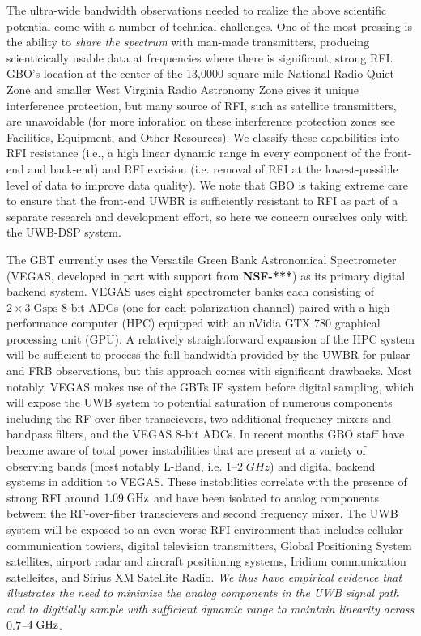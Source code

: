 \documentclass[10pt]{myNSF}
\begin{document}
\label{sec:technical_motivation}

The ultra-wide bandwidth observations needed to realize the above
scientific potential come with a number of technical challenges.  One
of the most pressing is the ability to \emph{share the spectrum} with
man-made transmitters, producing scienticically usable data at
frequencies where there is significant, strong RFI.  GBO's location at
the center of the 13,0000 square-mile National Radio Quiet Zone and
smaller West Virginia Radio Astronomy Zone gives it unique
interference protection, but many source of RFI, such as satellite
transmitters, are unavoidable (for more inforation on these
interference protection zones see Facilities, Equipment, and Other
Resources).  We classify these capabilities into RFI resistance (i.e.,
a high linear dynamic range in every component of the front-end and
back-end) and RFI excision (i.e. removal of RFI at the lowest-possible
level of data to improve data quality).  We note that GBO is taking
extreme care to ensure that the front-end UWBR is sufficiently
resistant to RFI as part of a separate research and development
effort, so here we concern ourselves only with the UWB-DSP system.

 The GBT currently uses the Versatile
Green Bank Astronomical Spectrometer (VEGAS, developed in part with
support from \textbf{NSF-***}) as its primary digital backend system.
VEGAS uses eight spectrometer banks each consisting of $2 \times 3\;
\mathrm{Gsps}$ 8-bit ADCs (one for each polarization channel) paired
with a high-performance computer (HPC) equipped with an nVidia GTX 780
graphical processing unit (GPU).  A relatively straightforward
expansion of the HPC system will be sufficient to process the full
bandwidth provided by the UWBR for pulsar and FRB observations, but
this approach comes with significant drawbacks.  Most notably, VEGAS
makes use of the GBTs IF system before digital sampling, which will
expose the UWB system to potential saturation of numerous components
including the RF-over-fiber transcievers, two additional frequency
mixers and bandpass filters, and the VEGAS 8-bit ADCs.  In recent
months GBO staff have become aware of total power instabilities that
are present at a variety of observing bands (most notably L-Band,
i.e. $1$--$2\; GHz$) and digital backend systems in addition to VEGAS.
These instabilities correlate with the presence of strong RFI around
$1.09\; \textrm{GHz}$ and have been isolated to analog components between the
RF-over-fiber transcievers and second frequency mixer.  The UWB system
will be exposed to an even worse RFI environment that includes
cellular communication towiers, digital television transmitters,
Global Positioning System satellites, airport radar and aircraft
positioning systems, Iridium communication satelleites, and Sirius XM
Satellite Radio.  \emph{We thus have empirical evidence that
  illustrates the need to minimize the analog components in the UWB
  signal path and to digitially sample with sufficient dynamic range
  to maintain linearity across $0.7$--$4\; \textrm{GHz}$}.
\end{document}
